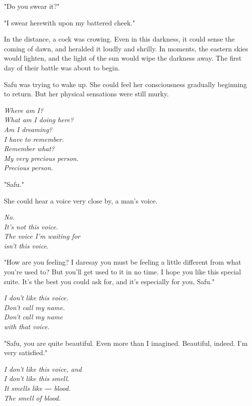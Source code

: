 "Do you swear it?"

"I swear herewith upon my battered cheek."

In the distance, a cock was crowing. Even in this darkness, it could
sense the coming of dawn, and heralded it loudly and shrilly. In
moments, the eastern skies would lighten, and the light of the sun would
wipe the darkness away. The first day of their battle was about to
begin.

\mybreak

Safu was trying to wake up. She could feel her consciousness gradually
beginning to return. But her physical sensations were still murky.

\myspace

\emph{Where am I?\\
	What am I doing here?\\
	Am I dreaming?\\
	I have to remember.\\
	Remember what?\\
	My very precious person.\\
	Precious person.}

\myspace

"Safu."

She could hear a voice very close by, a man's voice.

\myspace

\emph{No.\\
	It's not this voice.\\
	The voice I'm waiting for\\
	isn't this voice.}

\myspace

"How are you feeling? I daresay you must be feeling a little different
from what you're used to? But you'll get used to it in no time. I hope
you like this special suite. It's the best you could ask for, and it's
especially for you, Safu."

\myspace

\emph{I don't like this voice.\\
	Don't call my name.\\
	Don't call my name\\
	with that voice.}

\myspace

"Safu, you are quite beautiful. Even more than I imagined. Beautiful,
indeed. I'm very satisfied."

\myspace

\emph{I don't like this voice, and\\
	I don't like this smell.\\
	It smells like ― blood.\\
	The smell of blood.}

